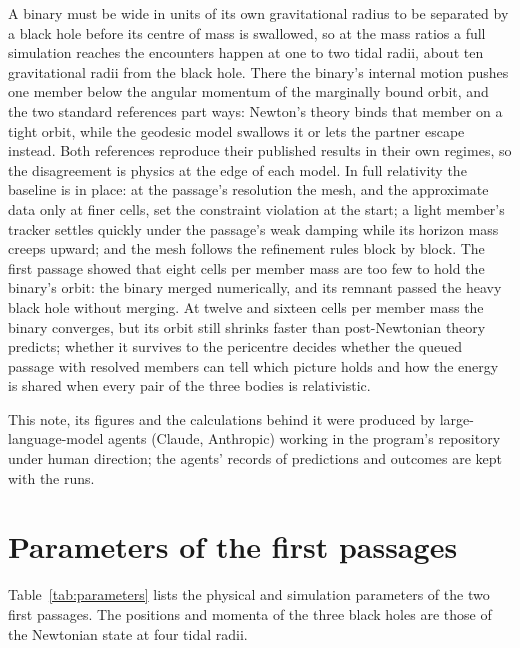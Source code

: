 \documentclass[aps,prd,twocolumn,10pt,superscriptaddress,nofootinbib,longbibliography,floatfix]{revtex4-2}
\begin{document}
A binary must be wide in units of its own gravitational radius to be separated by a black hole before its centre of mass is swallowed, so at the mass ratios a full simulation reaches the encounters happen at one to two tidal radii, about ten gravitational radii from the black hole. There the binary's internal motion pushes one member below the angular momentum of the marginally bound orbit, and the two standard references part ways: Newton's theory binds that member on a tight orbit, while the geodesic model swallows it or lets the partner escape instead. Both references reproduce their published results in their own regimes, so the disagreement is physics at the edge of each model. In full relativity the baseline is in place: at the passage's resolution the mesh, and the approximate data only at finer cells, set the constraint violation at the start; a light member's tracker settles quickly under the passage's weak damping while its horizon mass creeps upward; and the mesh follows the refinement rules block by block. The first passage showed that eight cells per member mass are too few to hold the binary's orbit: the binary merged numerically, and its remnant passed the heavy black hole without merging. At twelve and sixteen cells per member mass the binary converges, but its orbit still shrinks faster than post-Newtonian theory predicts; whether it survives to the pericentre decides whether the queued passage with resolved members can tell which picture holds and how the energy is shared when every pair of the three bodies is relativistic.

\begin{acknowledgments}
This note, its figures and the calculations behind it were produced by large-language-model agents (Claude, Anthropic) working in the program's repository under human direction; the agents' records of predictions and outcomes are kept with the runs.
\end{acknowledgments}

\appendix

\section{Parameters of the first passages}\label{app:parameters}

Table~\ref{tab:parameters} lists the physical and simulation parameters of the two first passages. The positions and momenta of the three black holes are those of the Newtonian state at four tidal radii.


\end{document}
